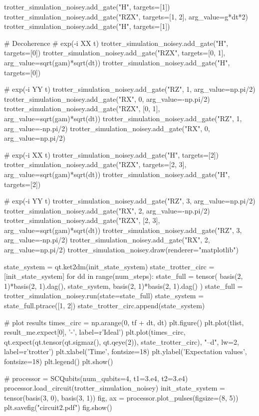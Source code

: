 trotter_simulation_noisey.add_gate("H", targets=[1])
trotter_simulation_noisey.add_gate("RZX", targets=[1, 2], arg_value=g*dt*2)
trotter_simulation_noisey.add_gate("H", targets=[1])

# Decoherence
# exp(-i XX t)
trotter_simulation_noisey.add_gate("H", targets=[0])
trotter_simulation_noisey.add_gate("RZX", targets=[0, 1], arg_value=sqrt(gam)*sqrt(dt))
trotter_simulation_noisey.add_gate("H", targets=[0])

# exp(-i YY t)
trotter_simulation_noisey.add_gate("RZ", 1, arg_value=np.pi/2)
trotter_simulation_noisey.add_gate("RX", 0, arg_value=-np.pi/2)
trotter_simulation_noisey.add_gate("RZX", [0, 1], arg_value=sqrt(gam)*sqrt(dt))
trotter_simulation_noisey.add_gate("RZ", 1, arg_value=-np.pi/2)
trotter_simulation_noisey.add_gate("RX", 0, arg_value=np.pi/2)

# exp(-i XX t)
trotter_simulation_noisey.add_gate("H", targets=[2])
trotter_simulation_noisey.add_gate("RZX", targets=[2, 3], arg_value=sqrt(gam)*sqrt(dt))
trotter_simulation_noisey.add_gate("H", targets=[2])

# exp(-i YY t)
trotter_simulation_noisey.add_gate("RZ", 3, arg_value=np.pi/2)
trotter_simulation_noisey.add_gate("RX", 2, arg_value=-np.pi/2)
trotter_simulation_noisey.add_gate("RZX", [2, 3], arg_value=sqrt(gam)*sqrt(dt))
trotter_simulation_noisey.add_gate("RZ", 3, arg_value=-np.pi/2)
trotter_simulation_noisey.add_gate("RX", 2, arg_value=np.pi/2)
trotter_simulation_noisey.draw(renderer="matplotlib")

state_system = qt.ket2dm(init_state_system)
state_trotter_circ = [init_state_system]
for dd in range(num_steps):
    state_full = tensor(
        basis(2, 1)*basis(2, 1).dag(),
        state_system,
        basis(2, 1)*basis(2, 1).dag()
        )
    state_full = trotter_simulation_noisey.run(state=state_full)
    state_system = state_full.ptrace([1, 2])
    state_trotter_circ.append(state_system)
    

# plot results 
times_circ = np.arange(0, tf + dt, dt)
plt.figure()
plt.plot(tlist, result_me.expect[0], '-', label=r'Ideal')
plt.plot(times_circ, qt.expect(qt.tensor(qt.sigmaz(), qt.qeye(2)), state_trotter_circ), "--d", lw=2, label=r'trotter')
plt.xlabel('Time', fontsize=18)
plt.ylabel('Expectation values', fontsize=18)
plt.legend()
plt.show()


#%
processor = SCQubits(num_qubits=4, t1=3.e4, t2=3.e4)
processor.load_circuit(trotter_simulation_noisey)
init_state_system = tensor(basis(3, 0), basis(3, 1))
fig, ax = processor.plot_pulses(figsize=(8, 5))
plt.savefig("circuit2.pdf")
fig.show()

